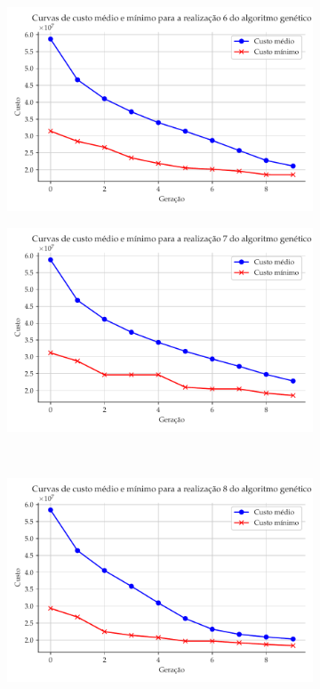 \documentclass[a4paper, 12pt]{article}
\begin{document}
\begin{figure}[!ht]
\begin{subfigure}{0.4\textwidth}
\end{subfigure}
\hfill
\\
\centering
\begin{subfigure}{0.4\textwidth}
    \includegraphics[width=\textwidth]{figuras/realizacao-6.pdf}
\end{subfigure}
\begin{subfigure}{0.4\textwidth}
    \includegraphics[width=\textwidth]{figuras/realizacao-7.pdf}
\end{subfigure}
\hfill
\\
\centering
\begin{subfigure}{0.4\textwidth}
    \includegraphics[width=\textwidth]{figuras/realizacao-8.pdf}

\end{subfigure}
\end{figure}
\end{document}
